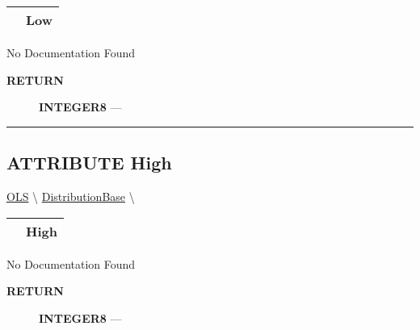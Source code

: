 {\renewcommand{\arraystretch}{1.5}
\begin{tabularx}{\textwidth}{|>{\raggedright\arraybackslash}l|X|}
\hline
\hspace{0pt}\mytexttt{\color{red} } & \textbf{Low} \\
\hline
\end{tabularx}
}

\par





No Documentation Found








\par
\begin{description}
\item [\colorbox{tagtype}{\color{white} \textbf{\textsf{RETURN}}}] \textbf{INTEGER8} --- 
\end{description}




\rule{\linewidth}{0.5pt}
\subsection*{\textsf{\colorbox{headtoc}{\color{white} ATTRIBUTE}
High}}

\hypertarget{ecldoc:linearregression.ols.distributionbase.high}{}
\hspace{0pt} \hyperlink{ecldoc:linearregression.ols}{OLS} \textbackslash 
\hspace{0pt} \hyperlink{ecldoc:linearregression.ols.distributionbase}{DistributionBase} \textbackslash 

{\renewcommand{\arraystretch}{1.5}
\begin{tabularx}{\textwidth}{|>{\raggedright\arraybackslash}l|X|}
\hline
\hspace{0pt}\mytexttt{\color{red} } & \textbf{High} \\
\hline
\end{tabularx}
}

\par





No Documentation Found








\par
\begin{description}
\item [\colorbox{tagtype}{\color{white} \textbf{\textsf{RETURN}}}] \textbf{INTEGER8} --- 
\end{description}




